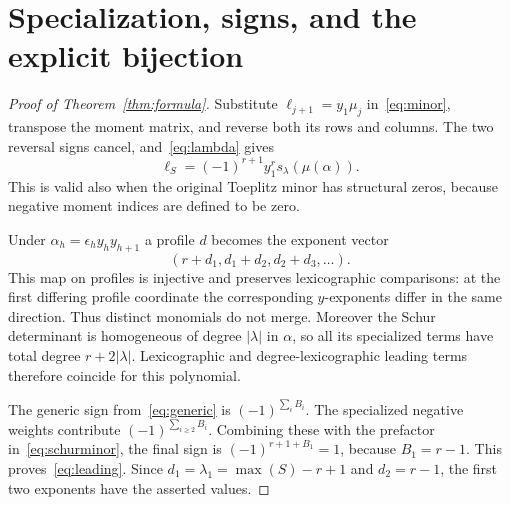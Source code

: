 \documentclass[11pt]{article}
\theoremstyle{definition}
\theoremstyle{remark}
\begin{document}
\section{Specialization, signs, and the explicit bijection}
\begin{proof}[Proof of Theorem~\ref{thm:formula}]
Substitute $\ell_{j+1}=y_1\mu_j$ in~\eqref{eq:minor}, transpose the moment
matrix, and reverse both its rows and columns. The two reversal signs
cancel, and~\eqref{eq:lambda} gives
\begin{equation}\label{eq:schurminor}
 \ell_S=(-1)^{r+1}y_1^r s_\lambda(\mu(\alpha)).
\end{equation}
This is valid also when the original Toeplitz minor has structural zeros,
because negative moment indices are defined to be zero.

Under $\alpha_h=\epsilon_h y_hy_{h+1}$ a profile $d$ becomes the exponent
vector
\[
 (r+d_1,d_1+d_2,d_2+d_3,\ldots).
\]
This map on profiles is injective and preserves lexicographic comparisons:
at the first differing profile coordinate the corresponding $y$-exponents
differ in the same direction. Thus distinct monomials do not merge.
Moreover the Schur determinant is homogeneous of degree $|\lambda|$ in
$\alpha$, so all its specialized terms have total degree
$r+2|\lambda|$. Lexicographic and degree-lexicographic leading terms
therefore coincide for this polynomial.

The generic sign from~\eqref{eq:generic} is $(-1)^{\sum_i B_i}$.
The specialized negative weights contribute $(-1)^{\sum_{i\ge2}B_i}$.
Combining these with the prefactor in~\eqref{eq:schurminor}, the final sign
is $(-1)^{r+1+B_1}=1$, because $B_1=r-1$.
This proves~\eqref{eq:leading}. Since $d_1=\lambda_1=\max(S)-r+1$ and
$d_2=r-1$, the first two exponents have the asserted values.
\end{proof}
\end{document}
